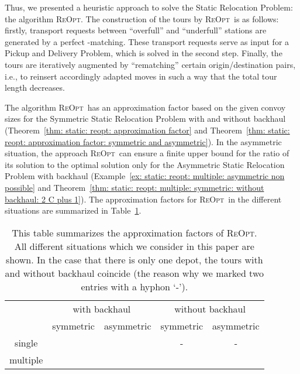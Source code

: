 \documentclass[english]{llncs}
\numberwithin{sublemma}{lemma}
\newcommand{\REOPT}{\textsc{ReOpt}\xspace}
\begin{document}
Thus, we presented a heuristic approach to solve the Static Relocation Problem: the algorithm \REOPT.
The construction of the tours by \REOPT\ is as follows:
firstly, transport requests between ``overfull'' and ``underfull'' stations are generated by a perfect -matching.
These transport requests serve as input for a Pickup and Delivery Problem, which is solved in the second step.
Finally, the tours are iteratively augmented by ``rematching'' certain origin/destination pairs, i.e., to reinsert accordingly adapted moves in such a way 
that the total tour length decreases.



The algorithm \REOPT\ has an approximation factor based on the given convoy sizes for the Symmetric Static Relocation Problem with and without backhaul
(Theorem~\ref{thm: static: reopt: approximation factor} and Theorem~\ref{thm: static: reopt: approximation factor: symmetric and asymmetric}).
In the asymmetric situation, the approach \REOPT\ can ensure a finite upper bound for the ratio of its solution to the optimal solution
only for the Asymmetric Static Relocation Problem with backhaul (Example~\ref{ex: static: reopt: multiple: asymmetric non possible} and Theorem~\ref{thm: static: reopt: multiple: symmetric: without backhaul: 2 C plus 1}).
The approximation factors for \REOPT\ in the different situations are summarized in Table~\ref{tab: conclusion: summary: approximation factors}.

\begin{table}[!htbp]
\centering
\caption{This table summarizes the approximation factors of \REOPT.
    All different situations which we consider in this paper are shown.
    In the case that there is only one depot, the tours with and without backhaul coincide (the reason why we marked two entries with a hyphon `-').}
\label{tab: conclusion: summary: approximation factors}
\begin{tabular}{c|c|c|c|c}
&  \multicolumn{2}{c|}{with backhaul} & \multicolumn{2}{c}{without backhaul} \\ \cline{2-5}
          & symmetric   & asymmetric           & symmetric & asymmetric \\ \cline{2-5}
single    &  &           & - & - \\ \hline
multiple  &  &           &   &  \\
\end{tabular}
\end{table}
\end{document}
